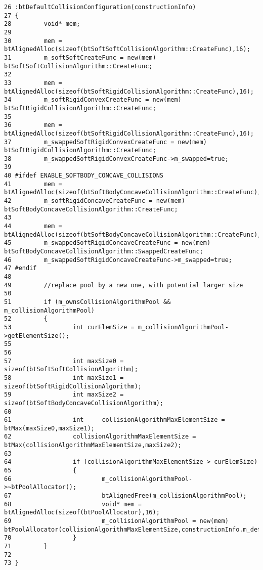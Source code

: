 \begin{Code}\begin{verbatim}26 :btDefaultCollisionConfiguration(constructionInfo)
27 {
28         void* mem;
29 
30         mem = btAlignedAlloc(sizeof(btSoftSoftCollisionAlgorithm::CreateFunc),16);
31         m_softSoftCreateFunc = new(mem) btSoftSoftCollisionAlgorithm::CreateFunc;
32 
33         mem = btAlignedAlloc(sizeof(btSoftRigidCollisionAlgorithm::CreateFunc),16);
34         m_softRigidConvexCreateFunc = new(mem) btSoftRigidCollisionAlgorithm::CreateFunc;
35 
36         mem = btAlignedAlloc(sizeof(btSoftRigidCollisionAlgorithm::CreateFunc),16);
37         m_swappedSoftRigidConvexCreateFunc = new(mem) btSoftRigidCollisionAlgorithm::CreateFunc;
38         m_swappedSoftRigidConvexCreateFunc->m_swapped=true;
39 
40 #ifdef ENABLE_SOFTBODY_CONCAVE_COLLISIONS
41         mem = btAlignedAlloc(sizeof(btSoftBodyConcaveCollisionAlgorithm::CreateFunc),16);
42         m_softRigidConcaveCreateFunc = new(mem) btSoftBodyConcaveCollisionAlgorithm::CreateFunc;
43 
44         mem = btAlignedAlloc(sizeof(btSoftBodyConcaveCollisionAlgorithm::CreateFunc),16);
45         m_swappedSoftRigidConcaveCreateFunc = new(mem) btSoftBodyConcaveCollisionAlgorithm::SwappedCreateFunc;
46         m_swappedSoftRigidConcaveCreateFunc->m_swapped=true;
47 #endif
48 
49         //replace pool by a new one, with potential larger size
50 
51         if (m_ownsCollisionAlgorithmPool && m_collisionAlgorithmPool)
52         {
53                 int curElemSize = m_collisionAlgorithmPool->getElementSize();
55 
56 
57                 int maxSize0 = sizeof(btSoftSoftCollisionAlgorithm);
58                 int maxSize1 = sizeof(btSoftRigidCollisionAlgorithm);
59                 int maxSize2 = sizeof(btSoftBodyConcaveCollisionAlgorithm);
60 
61                 int     collisionAlgorithmMaxElementSize = btMax(maxSize0,maxSize1);
62                 collisionAlgorithmMaxElementSize = btMax(collisionAlgorithmMaxElementSize,maxSize2);
63                 
64                 if (collisionAlgorithmMaxElementSize > curElemSize)
65                 {
66                         m_collisionAlgorithmPool->~btPoolAllocator();
67                         btAlignedFree(m_collisionAlgorithmPool);
68                         void* mem = btAlignedAlloc(sizeof(btPoolAllocator),16);
69                         m_collisionAlgorithmPool = new(mem) btPoolAllocator(collisionAlgorithmMaxElementSize,constructionInfo.m_defaultMaxCollisionAlgorithmPoolSize);
70                 }
71         }
72 
73 }
\end{verbatim}
\end{Code}




